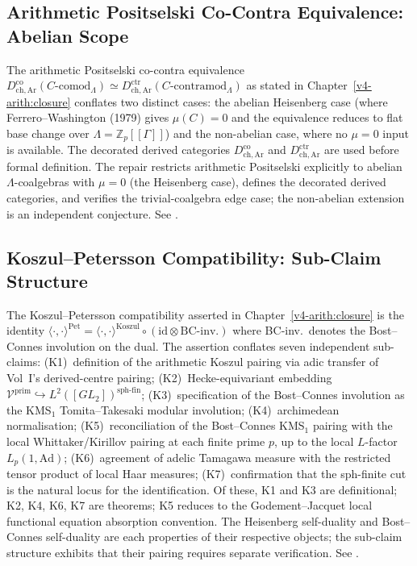 \subsection{Arithmetic Positselski Co-Contra Equivalence: Abelian Scope}

The arithmetic Positselski co-contra equivalence
\(D^{\mathrm{co}}_{\mathrm{ch,Ar}}(C\text{-comod}_\Lambda)\simeq
D^{\mathrm{ctr}}_{\mathrm{ch,Ar}}(C\text{-contramod}_\Lambda)\)
as stated in Chapter~\ref{v4-arith:closure} conflates two distinct
cases: the abelian Heisenberg case (where Ferrero--Washington (1979)
gives \(\mu(C)=0\) and the equivalence reduces to flat base change over
\(\Lambda=\mathbb{Z}_p[[\Gamma]]\)) and the non-abelian case, where
no \(\mu=0\) input is available. The decorated derived categories
\(D^{\mathrm{co}}_{\mathrm{ch,Ar}}\) and
\(D^{\mathrm{ctr}}_{\mathrm{ch,Ar}}\) are used before formal definition.
The repair restricts arithmetic Positselski explicitly to abelian
\(\Lambda\)-coalgebras with \(\mu=0\) (the Heisenberg case), defines
the decorated derived categories, and verifies the trivial-coalgebra
edge case; the non-abelian extension is an independent conjecture.
See .

\subsection{Koszul--Petersson Compatibility: Sub-Claim Structure}

The Koszul--Petersson compatibility asserted in Chapter~\ref{v4-arith:closure}
is the identity
\(\langle\cdot,\cdot\rangle^{\mathrm{Pet}}=\langle\cdot,\cdot\rangle^{\mathrm{Koszul}}\circ(\mathrm{id}\otimes\text{BC-inv.})\)
where BC-inv.\ denotes the Bost--Connes involution on the dual.
The assertion conflates seven independent sub-claims:
(K1)~definition of the arithmetic Koszul pairing via adic transfer of
Vol~I's derived-centre pairing;
(K2)~Hecke-equivariant embedding
\(\mathcal{V}^{\mathrm{prim}}\hookrightarrow L^{2}([GL_{2}])^{\mathrm{sph\text{-}fin}}\);
(K3)~specification of the Bost--Connes involution as the
KMS\({}_{1}\) Tomita--Takesaki modular involution;
(K4)~archimedean normalisation;
(K5)~reconciliation of the Bost--Connes KMS\({}_{1}\) pairing with
the local Whittaker/Kirillov pairing at each finite prime \(p\), up
to the local \(L\)-factor \(L_{p}(1,\mathrm{Ad})\);
(K6)~agreement of adelic Tamagawa measure with the restricted tensor
product of local Haar measures;
(K7)~confirmation that the sph-finite cut is the natural locus for
the identification.
Of these, K1 and K3 are definitional; K2, K4, K6, K7 are theorems;
K5 reduces to the Godement--Jacquet local functional equation
absorption convention.
The Heisenberg self-duality and Bost--Connes self-duality are each
properties of their respective objects; the sub-claim structure
exhibits that their pairing requires separate verification.
See .

